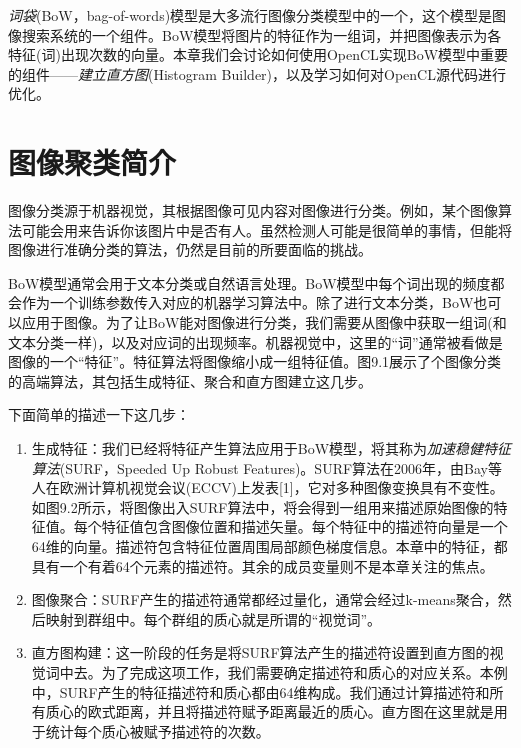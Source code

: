 
\emph{词袋}(BoW，bag-of-words)模型是大多流行图像分类模型中的一个，这个模型是图像搜索系统的一个组件。BoW模型将图片的特征作为一组词，并把图像表示为各特征(词)出现次数的向量。本章我们会讨论如何使用OpenCL实现BoW模型中重要的组件——\emph{建立直方图}(Histogram Builder)，以及学习如何对OpenCL源代码进行优化。


\section{图像聚类简介}

图像分类源于机器视觉，其根据图像可见内容对图像进行分类。例如，某个图像算法可能会用来告诉你该图片中是否有人。虽然检测人可能是很简单的事情，但能将图像进行准确分类的算法，仍然是目前的所要面临的挑战。

BoW模型通常会用于文本分类或自然语言处理。BoW模型中每个词出现的频度都会作为一个训练参数传入对应的机器学习算法中。除了进行文本分类，BoW也可以应用于图像。为了让BoW能对图像进行分类，我们需要从图像中获取一组词(和文本分类一样)，以及对应词的出现频率。机器视觉中，这里的“词”通常被看做是图像的一个“特征”。特征算法将图像缩小成一组特征值。图9.1展示了个图像分类的高端算法，其包括生成特征、聚合和直方图建立这几步。



下面简单的描述一下这几步：

\begin{enumerate}
\item 生成特征：我们已经将特征产生算法应用于BoW模型，将其称为\emph{加速稳健特征算法}(SURF，Speeded Up Robust Features)。SURF算法在2006年，由Bay等人在欧洲计算机视觉会议(ECCV)上发表[1]，它对多种图像变换具有不变性。如图9.2所示，将图像出入SURF算法中，将会得到一组用来描述原始图像的特征值。每个特征值包含图像位置和描述矢量。每个特征中的描述符向量是一个64维的向量。描述符包含特征位置周围局部颜色梯度信息。本章中的特征，都具有一个有着64个元素的描述符。其余的成员变量则不是本章关注的焦点。
\item 图像聚合：SURF产生的描述符通常都经过量化，通常会经过k-means聚合，然后映射到群组中。每个群组的质心就是所谓的“视觉词”。
\item 直方图构建：这一阶段的任务是将SURF算法产生的描述符设置到直方图的视觉词中去。为了完成这项工作，我们需要确定描述符和质心的对应关系。本例中，SURF产生的特征描述符和质心都由64维构成。我们通过计算描述符和所有质心的欧式距离，并且将描述符赋予距离最近的质心。直方图在这里就是用于统计每个质心被赋予描述符的次数。
\end{enumerate}


